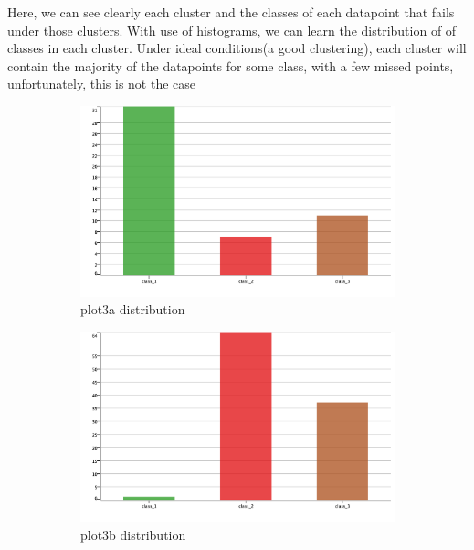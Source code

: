 \documentclass[11pt]{article}
\begin{document}
	 	\fi
		Here, we can see clearly each cluster and the classes of each datapoint that fails under those clusters. With use of histograms, we can learn the distribution of of classes in each cluster. Under ideal conditions(a good clustering), each cluster will contain the majority of the datapoints for some class, with a few missed points, unfortunately, this is not the case
		\iffalse
		\begin{figure}[H]
			\centering
			\begin{subfigure}{0.4\textwidth}
				\includegraphics[width=\textwidth]{res/task-1/plot3adist}
				\caption{plot3a distribution}
				\label{fig:first}
			\end{subfigure}
			\hfill
			\begin{subfigure}{0.4\textwidth}
				\includegraphics[width=\textwidth]{res/task-1/plot3bdist}
				\caption{plot3b distribution}
				\label{fig:second}
			\end{subfigure}
			\hfill
			\begin{subfigure}{0.4\textwidth}

\end{subfigure}
\end{figure}
\end{document}
